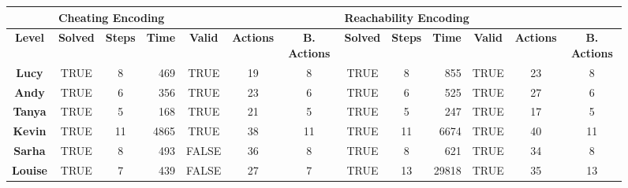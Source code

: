 \documentclass{report}
\theoremstyle{plain}
\begin{document}
\begin{figure}
    \centering
\begin{tabular}{c|c|c|r|c|c|c|c|c|r|c|c|c|}
\cline{2-13}
\multicolumn{1}{l|}{\textbf{}}                       & \multicolumn{6}{l|}{\textbf{Cheating Encoding}}                                                        & \multicolumn{6}{l|}{\textbf{Reachability Encoding}}                                                    \\ \hline
\multicolumn{1}{|c|}{\textbf{Level}}                 & \textbf{Solved} & \textbf{Steps} & \multicolumn{1}{c|}{\textbf{Time}} & \textbf{Valid} & \textbf{Actions} & \textbf{B. Actions} & \textbf{Solved} & \textbf{Steps} & \multicolumn{1}{c|}{\textbf{Time}} & \textbf{Valid} & \textbf{Actions} & \textbf{B. Actions} \\ \hline
\multicolumn{1}{|c|}{\textbf{Lucy}}                  & TRUE            & 8              & 469           & TRUE           & 19               & 8                   & TRUE            & 8              & 855           & TRUE           & 23               & 8                   \\ \hline
\multicolumn{1}{|c|}{\textbf{Andy}}                  & TRUE            & 6              & 356           & TRUE           & 23               & 6                   & TRUE            & 6              & 525           & TRUE           & 27               & 6                   \\ \hline
\multicolumn{1}{|c|}{\textbf{Tanya}}                 & TRUE            & 5              & 168           & TRUE           & 21               & 5                   & TRUE            & 5              & 247           & TRUE           & 17               & 5                   \\ \hline
\multicolumn{1}{|c|}{\textbf{Kevin}}                 & TRUE            & 11             & 4865          & TRUE           & 38               & 11                  & TRUE            & 11             & 6674          & TRUE           & 40               & 11                  \\ \hline
\multicolumn{1}{|c|}{\textbf{Sarha}}                 & TRUE            & 8              & 493           & FALSE          & 36               & 8                   & TRUE            & 8              & 621           & TRUE           & 34               & 8                   \\ \hline
\multicolumn{1}{|c|}{\textbf{Louise}}                & TRUE            & 7              & 439           & FALSE          & 27               & 7                   & TRUE            & 13             & 29818         & TRUE           & 35               & 13                  \\ \hline

\end{tabular}
\end{figure}
\end{document}
